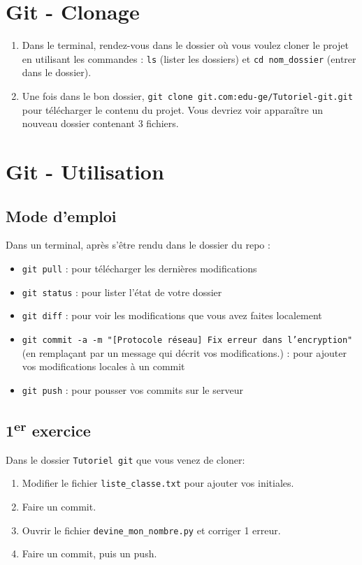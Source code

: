 \documentclass[11pt, a4paper]{book}
\begin{document}
\section{Git - Clonage}

\begin{enumerate}
    \item Dans le terminal, rendez-vous dans le dossier où vous voulez cloner le projet en utilisant les commandes :
        \subitem \texttt{ls} (lister les dossiers) 
        \subitem et \texttt{cd nom\_dossier} (entrer dans le dossier).
    \item Une fois dans le bon dossier, \texttt{git clone git\@github.com:edu-ge/Tutoriel-git.git} pour télécharger le contenu du projet. Vous devriez voir apparaître un nouveau dossier contenant 3 fichiers.

\end{enumerate}

\section{Git - Utilisation}
\subsection{Mode d'emploi}
Dans un terminal, après s'être rendu dans le dossier du repo : 
\begin{itemize}
    \item \texttt{git pull} : pour télécharger les dernières modifications
    \item \texttt{git status} : pour lister l'état de votre dossier
    \item \texttt{git diff} : pour voir les modifications que vous avez faites localement
    \item \texttt{git commit -a -m "[Protocole réseau] Fix erreur dans l'encryption"} (en remplaçant par un message qui décrit vos modifications.) : pour ajouter vos modifications locales à un commit 
    \item \texttt{git push} : pour pousser vos commits sur le serveur
\end{itemize}


\subsection{1\textsuperscript{er} exercice}
Dans le dossier \texttt{Tutoriel git} que vous venez de cloner:
\begin{enumerate}
    \item Modifier le fichier \texttt{liste\_classe.txt} pour ajouter vos initiales.
    \item Faire un commit.
    \item Ouvrir le fichier \texttt{devine\_mon\_nombre.py} et corriger 1 erreur.
    \item Faire un commit, puis un push.
\end{enumerate}
\end{document}
